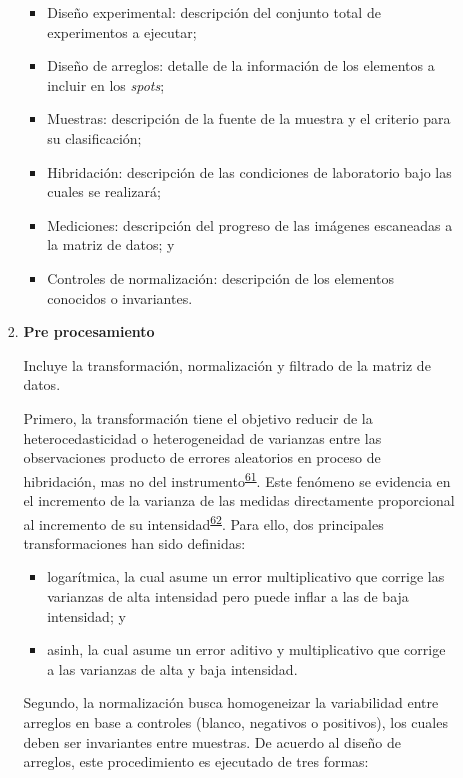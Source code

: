 \documentclass[]{article}
\providecommand{\tightlist}{%
  \setlength{\itemsep}{0pt}\setlength{\parskip}{0pt}}
\begin{document}
\begin{enumerate}
\begin{enumerate}
\begin{enumerate}
      \begin{itemize}
      \tightlist
      \item
        Diseño experimental: descripción del conjunto total de
        experimentos a ejecutar;
      \item
        Diseño de arreglos: detalle de la información de los elementos a
        incluir en los \emph{spots};
      \item
        Muestras: descripción de la fuente de la muestra y el criterio
        para su clasificación;
      \item
        Hibridación: descripción de las condiciones de laboratorio bajo
        las cuales se realizará;
      \item
        Mediciones: descripción del progreso de las imágenes escaneadas
        a la matriz de datos; y
      \item
        Controles de normalización: descripción de los elementos
        conocidos o invariantes.
      \end{itemize}
    \item
      \textbf{Pre procesamiento}

      Incluye la transformación, normalización y filtrado de la matriz
      de datos.

      Primero, la transformación tiene el objetivo reducir de la
      heterocedasticidad o heterogeneidad de varianzas entre las
      observaciones producto de errores aleatorios en proceso de
      hibridación, mas no del
      instrumento\textsuperscript{\protect\hyperlink{ref-kreil2005bullet}{61}}.
      Este fenómeno se evidencia en el incremento de la varianza de las
      medidas directamente proporcional al incremento de su
      intensidad\textsuperscript{\protect\hyperlink{ref-brown2001image}{62}}.
      Para ello, dos principales transformaciones han sido definidas:

      \begin{itemize}
      \tightlist
      \item
        logarítmica, la cual asume un error multiplicativo que corrige
        las varianzas de alta intensidad pero puede inflar a las de baja
        intensidad; y
      \item
        asinh, la cual asume un error aditivo y multiplicativo que
        corrige a las varianzas de alta y baja intensidad.
      \end{itemize}

      Segundo, la normalización busca homogeneizar la variabilidad entre
      arreglos en base a controles (blanco, negativos o positivos), los
      cuales deben ser invariantes entre muestras. De acuerdo al diseño
      de arreglos, este procedimiento es ejecutado de tres formas:


\end{enumerate}
\end{enumerate}
\end{enumerate}
\end{document}
